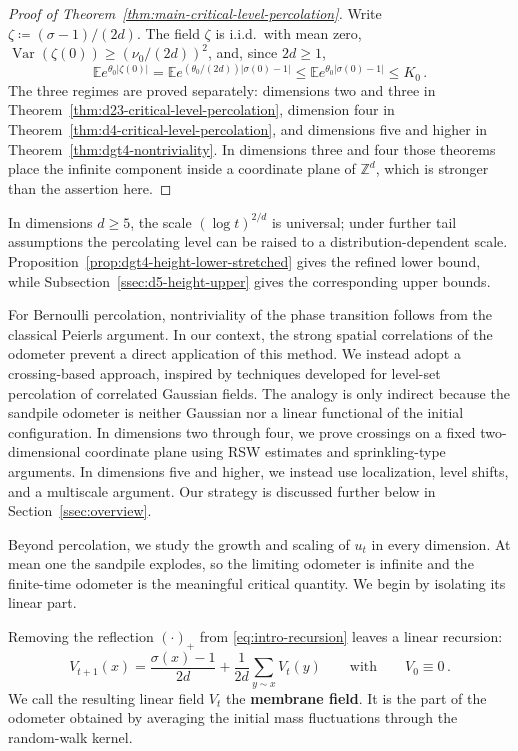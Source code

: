 \documentclass[11pt]{amsart}
\theoremstyle{plain}
\theoremstyle{definition}
\newcommand{\Z}{\mathbb{Z}}
\newcommand{\E}{\mathbb{E}}
\DeclareMathOperator{\Var}{Var}
\begin{document}
\begin{proof}[Proof of Theorem~\ref{thm:main-critical-level-percolation}]
Write $\zeta\coloneqq(\sigma-1)/(2d)$. The field $\zeta$ is i.i.d.\ with mean zero,
$\Var(\zeta(0))\geq(\nu_{0}/(2d))^2$, and, since $2d\geq1$,
\[
    \E e^{\theta_{0}|\zeta(0)|}
    =\E e^{(\theta_{0}/(2d))|\sigma(0)-1|}
    \leq\E e^{\theta_{0}|\sigma(0)-1|}\leq K_{0}\, .
\]
The three regimes are proved separately: dimensions two and three in
Theorem~\ref{thm:d23-critical-level-percolation}, dimension four in
Theorem~\ref{thm:d4-critical-level-percolation}, and dimensions five and higher
in Theorem~\ref{thm:dgt4-nontriviality}. In dimensions three and four those
theorems place the infinite component inside a coordinate plane of $\Z^d$, which
is stronger than the assertion here.
\end{proof}

In dimensions $d\geq5$, the scale $(\log t)^{2/d}$ is universal; under further tail assumptions the percolating level can be raised to a distribution-dependent scale. Proposition~\ref{prop:dgt4-height-lower-stretched} gives the refined lower bound, while Subsection~\ref{ssec:d5-height-upper} gives the corresponding upper bounds.

For Bernoulli percolation, nontriviality of the phase transition follows from the classical Peierls argument. In our context, the strong spatial correlations of the odometer prevent a direct application of this method. We instead adopt a crossing-based approach, inspired by techniques developed for level-set percolation of correlated Gaussian fields. The analogy is only indirect because the sandpile odometer is neither Gaussian nor a linear functional of the initial configuration. In dimensions two through four, we prove crossings on a fixed two-dimensional coordinate plane using RSW estimates and sprinkling-type arguments. In dimensions five and higher, we instead use localization, level shifts, and a multiscale argument. Our strategy is discussed further below in Section~\ref{ssec:overview}.

Beyond percolation, we study the growth and scaling of $u_t$ in every dimension. At mean one the sandpile explodes, so the limiting odometer is infinite and the finite-time odometer is the meaningful critical quantity. We begin by isolating its linear part.

Removing the reflection $(\cdot)_+$ from \eqref{eq:intro-recursion} leaves a linear recursion:
\begin{equation}\label{eq:membrane-recursion}
V_{t+1}(x)=\frac{\sigma(x)-1}{2d}+\frac1{2d}\sum_{y\sim x}V_t(y)
\qquad\text{with}\qquad V_0\equiv0\, .
\end{equation}
We call the resulting linear field $V_t$ the \textbf{membrane field}. It is the part of the odometer obtained by averaging the initial mass fluctuations through the random-walk kernel.
\end{document}
